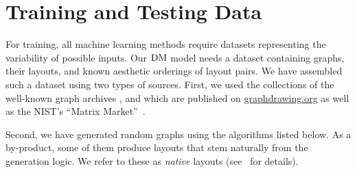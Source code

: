 
%

\section{Training and Testing Data}
\label{sec:data}

For training, all machine learning methods require datasets representing the variability of possible inputs.  Our $\operatorname{DM}$
model needs a dataset containing graphs, their layouts, and known aesthetic orderings of layout pairs.  We have
assembled such a dataset using two types of sources.  First, we used the collections of the well-known graph archives
,  and  which are published on \url{graphdrawing.org} as well as the NIST's
\enquote{Matrix Market}~\cite{MatrixMarket}.  

Second, we have generated random graphs using the algorithms listed below.  As a by-product, some of them produce
layouts that stem naturally from the generation logic.  We refer to these as \emph{native} layouts (see~\cite{Moritz18}
for details).  

